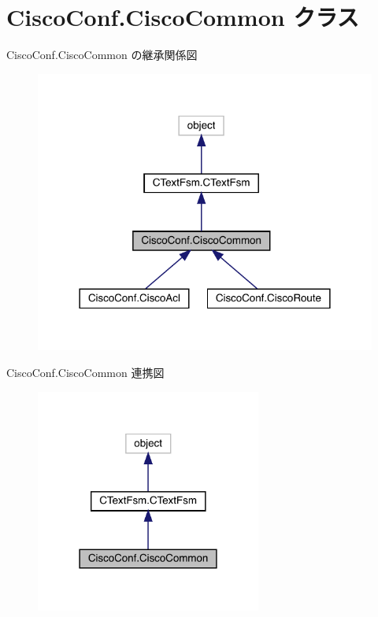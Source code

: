 \hypertarget{classCiscoConf_1_1CiscoCommon}{}\section{Cisco\+Conf.\+Cisco\+Common クラス}
\label{classCiscoConf_1_1CiscoCommon}


Cisco\+Conf.\+Cisco\+Common の継承関係図
\nopagebreak
\begin{figure}[H]
\begin{center}
\leavevmode
\includegraphics[width=318pt]{classCiscoConf_1_1CiscoCommon__inherit__graph}
\end{center}
\end{figure}


Cisco\+Conf.\+Cisco\+Common 連携図
\nopagebreak
\begin{figure}[H]
\begin{center}
\leavevmode
\includegraphics[width=210pt]{classCiscoConf_1_1CiscoCommon__coll__graph}
\end{center}
\end{figure}
